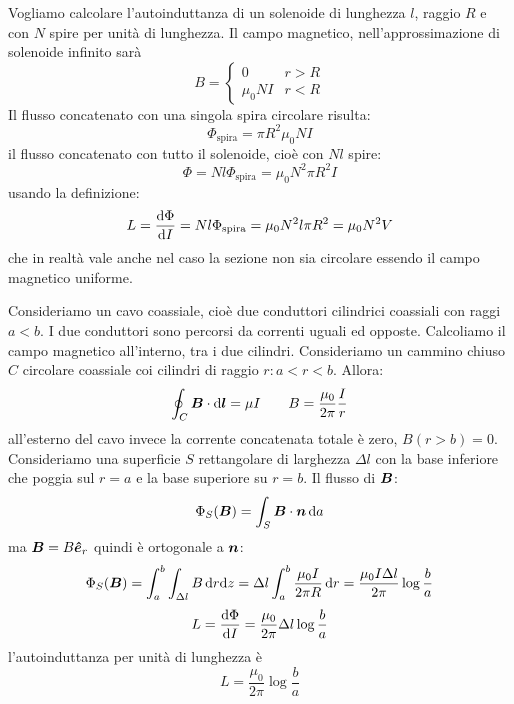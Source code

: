 \begin{Es}
Vogliamo calcolare l'autoinduttanza di un solenoide di lunghezza $l$, raggio $R$ e con $N$ spire per unità di lunghezza. Il campo magnetico, nell'approssimazione di solenoide infinito sarà 
\begin{equation}
B=
\left\{
\begin{array}{ll}
0&r>R\\
\mu_0NI&r<R
\end{array}
\right.
\end{equation}
Il flusso concatenato con una singola spira circolare risulta:
\begin{equation}
\Phi_\text{spira}=\pi R^2\mu_0NI
\end{equation}
il flusso concatenato con tutto il solenoide, cioè con $Nl$ spire:
\begin{equation}
\Phi=Nl\Phi_\text{spira}=\mu_0N^2\pi R^2 I
\end{equation}
usando la definizione:
\begin{equation}
L=\frac{\mathrm{d}\Phi}{\mathrm{d} I}=Nl\Phi_\text{spira}=\mu_0N^2l\pi R^2=\mu_0 N^2 V
\end{equation}
che in realtà vale anche nel caso la sezione non sia circolare essendo il campo magnetico uniforme.
\end{Es}
\begin{Es}
Consideriamo un cavo coassiale, cioè due conduttori cilindrici coassiali con raggi $a<b$. I due conduttori sono percorsi da correnti uguali ed opposte. Calcoliamo il campo magnetico all'interno, tra i due cilindri. Consideriamo un cammino chiuso $C$ circolare coassiale coi cilindri di raggio $r:a<r<b$. Allora:
\begin{equation}
\oint_C\boldsymbol{B}\cdot\mathrm{d}\boldsymbol{l}=\mu I\qquad B=\frac{\mu_0}{2\pi}\frac{I}{r}
\end{equation}
all'esterno del cavo invece la corrente concatenata totale è zero, $B(r>b)=0$. Consideriamo una superficie $S$ rettangolare di larghezza $\Delta l$ con la base inferiore che poggia sul $r=a$ e la base superiore su $r=b$. Il flusso di $\boldsymbol{B}$:
\begin{equation}
\Phi_S(\boldsymbol{B})=\int_S \boldsymbol{B}\cdot\boldsymbol{n}\,\mathrm{d} a
\end{equation}
ma $\boldsymbol{B}=B\boldsymbol{\hat {e}}_r$ quindi è ortogonale a $\boldsymbol{n}$:
\begin{equation}
\Phi_S(\boldsymbol{B})=\int_{a}^{b}\int_{\Delta l} B\,\mathrm{d} r\mathrm{d} z=\Delta l\int_a^b\frac{\mu_0I}{2\pi R}\,\mathrm{d} r=\frac{\mu_0I\Delta l}{2\pi}\log\frac{b}{a}
\end{equation}
\begin{equation}
L=\frac{\mathrm{d}\Phi}{\mathrm{d} I}=\frac{\mu_0}{2\pi}\Delta l\log\frac{b}{a}
\end{equation}
l'autoinduttanza per unità di lunghezza è 
\begin{equation}
L=\frac{\mu_0}{2\pi}\log\frac{b}{a}
\end{equation}
\end{Es}
